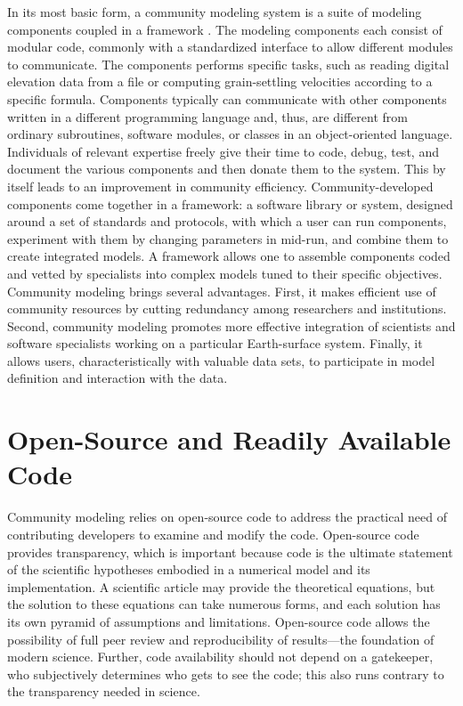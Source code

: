 \documentclass[10pt,twocolumn,preprint]{elsarticle}
\begin{document}
In its most basic form, a community modeling system is a suite of modeling components coupled in a framework \citep{voinov2010community}. The modeling components each consist of modular code, commonly with a standardized interface to allow different modules to communicate. The components performs specific tasks, such as reading digital elevation data from a file or computing grain-settling velocities according to a specific formula. Components typically can communicate with other components written in a different programming language and, thus, are different from ordinary subroutines, software modules, or classes in an object-oriented language. Individuals of relevant expertise freely give their time to code, debug, test, and document the various components and then donate them to the system. This by itself leads to an improvement in community efficiency. Community-developed components come together in a framework: a software library or system, designed around a set of standards and protocols, with which a user can run components, experiment with them by changing parameters in mid-run, and combine them to create integrated models. A framework allows one to assemble components coded and vetted by specialists into complex models tuned to their specific objectives. Community modeling brings several advantages. First, it makes efficient use of community resources by cutting redundancy among researchers and institutions. Second, community modeling promotes more effective integration of scientists and software specialists working on a particular Earth-surface system. Finally, it allows users, characteristically with valuable data sets, to participate in model definition and interaction with the data.



\section{Open-Source and Readily Available Code}

Community modeling relies on open-source code to address the practical need of contributing developers to examine and modify the code. Open-source code provides transparency, which is important because code is the ultimate statement of the scientific hypotheses embodied in a numerical model and its implementation. A scientific article may provide the theoretical equations, but the solution to these equations can take numerous forms, and each solution has its own pyramid of assumptions and limitations. Open-source code allows the possibility of full peer review and reproducibility of results---the foundation of modern science. Further, code availability should not depend on a gatekeeper, who subjectively determines who gets to see the code; this also runs contrary to the transparency needed in science.
\end{document}
